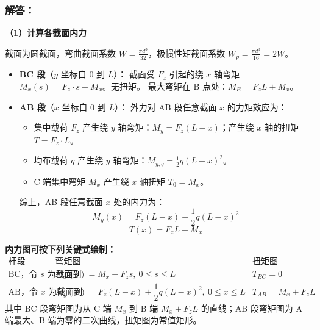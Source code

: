\documentclass[11pt,a4paper]{ctexrep}
\begin{document}
{\begin{center}
\end{center}

\subsubsection*{解答：}

\textbf{（1）计算各截面内力}

截面为圆截面，弯曲截面系数 $W = \frac{\pi d^3}{32}$，极惯性矩截面系数 $W_p = \frac{\pi d^3}{16} = 2W$。
\begin{itemize}
    \item \textbf{BC 段}（$y$ 坐标自 0 到 $L$）：
    截面受 $F_z$ 引起的绕 $x$ 轴弯矩 $M_x(s) = F_z \cdot s + M_x$。无扭矩。
    最大弯矩在 B 点处：$M_B = F_z L + M_x$。
    \item \textbf{AB 段}（$x$ 坐标自 0 到 $L$）：
    外力对 AB 段任意截面 $x$ 的力矩效应为：
    \begin{itemize}
        \item 集中载荷 $F_z$ 产生绕 $y$ 轴弯矩：$M_y = F_z (L - x)$；产生绕 $x$ 轴的扭矩 $T = F_z \cdot L$。
        \item 均布载荷 $q$ 产生绕 $y$ 轴弯矩：$M_{y, q} = \frac{1}{2}q(L - x)^2$。
        \item C 端集中弯矩 $M_x$ 产生绕 $x$ 轴扭矩 $T_0 = M_x$。
    \end{itemize}
    综上，AB 段任意截面 $x$ 处的内力为：
    \[
        M_y(x) = F_z(L - x) + \frac{1}{2}q(L - x)^2
    \]
    \[
        T(x) = F_z L + M_x
    \]
\end{itemize}

\textbf{内力图可按下列关键式绘制：}
\[
\begin{array}{c|c|c}
\text{杆段} & \text{弯矩图} & \text{扭矩图}\\
\hline
\text{BC，令 }s\text{ 为截面到 C 端的距离} &
M_x(s)=M_x+F_zs,\ 0\le s\le L &
T_{BC}=0\\[3pt]
\text{AB，令 }x\text{ 为截面到 A 端的距离} &
M_y(x)=F_z(L-x)+\dfrac12q(L-x)^2,\ 0\le x\le L &
T_{AB}=M_x+F_zL
\end{array}
\]
其中 BC 段弯矩图为从 C 端 $M_x$ 到 B 端 $M_x+F_zL$ 的直线；AB 段弯矩图为 A 端最大、B 端为零的二次曲线，扭矩图为常值矩形。

}
\end{document}
